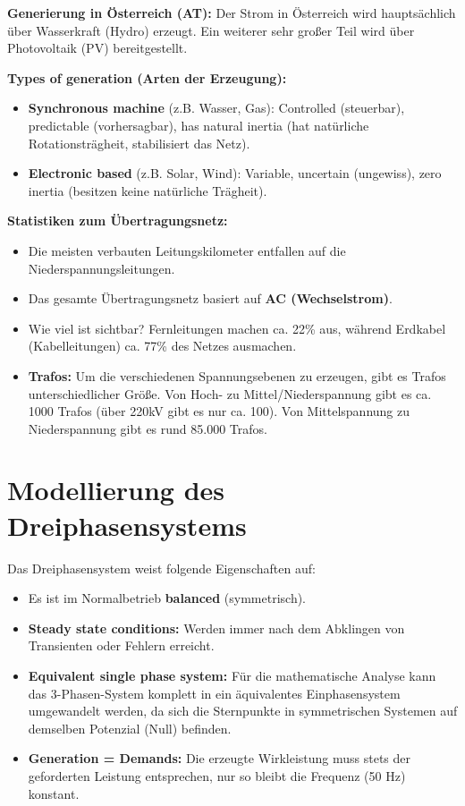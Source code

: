 \documentclass[11pt, a4paper]{article}
\begin{document}
\textbf{Generierung in Österreich (AT):}
Der Strom in Österreich wird hauptsächlich über Wasserkraft (Hydro) erzeugt. Ein weiterer sehr großer Teil wird über Photovoltaik (PV) bereitgestellt.

\textbf{Types of generation (Arten der Erzeugung):}
\begin{itemize}
    \item \textbf{Synchronous machine} (z.B. Wasser, Gas): Controlled (steuerbar), predictable (vorhersagbar), has natural inertia (hat natürliche Rotationsträgheit, stabilisiert das Netz).
    \item \textbf{Electronic based} (z.B. Solar, Wind): Variable, uncertain (ungewiss), zero inertia (besitzen keine natürliche Trägheit).
\end{itemize}

\textbf{Statistiken zum Übertragungsnetz:}
\begin{itemize}
    \item Die meisten verbauten Leitungskilometer entfallen auf die Niederspannungsleitungen.
    \item Das gesamte Übertragungsnetz basiert auf \textbf{AC (Wechselstrom)}.
    \item Wie viel ist sichtbar? Fernleitungen machen ca. 22\% aus, während Erdkabel (Kabelleitungen) ca. 77\% des Netzes ausmachen.
    \item \textbf{Trafos:} Um die verschiedenen Spannungsebenen zu erzeugen, gibt es Trafos unterschiedlicher Größe. Von Hoch- zu Mittel/Niederspannung gibt es ca. 1000 Trafos (über 220kV gibt es nur ca. 100). Von Mittelspannung zu Niederspannung gibt es rund 85.000 Trafos.
\end{itemize}

\section{Modellierung des Dreiphasensystems}
Das Dreiphasensystem weist folgende Eigenschaften auf:
\begin{itemize}
    \item Es ist im Normalbetrieb \textbf{balanced} (symmetrisch).
    \item \textbf{Steady state conditions:} Werden immer nach dem Abklingen von Transienten oder Fehlern erreicht.
    \item \textbf{Equivalent single phase system:} Für die mathematische Analyse kann das 3-Phasen-System komplett in ein äquivalentes Einphasensystem umgewandelt werden, da sich die Sternpunkte in symmetrischen Systemen auf demselben Potenzial (Null) befinden.
    \item \textbf{Generation = Demands:} Die erzeugte Wirkleistung muss stets der geforderten Leistung entsprechen, nur so bleibt die Frequenz (50 Hz) konstant.
\end{itemize}
\end{document}
